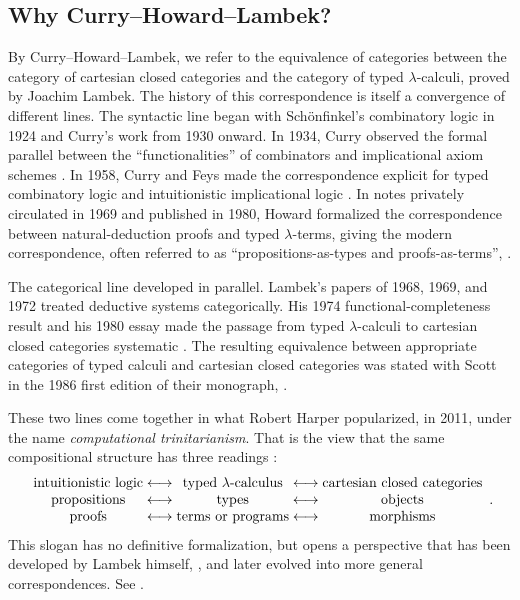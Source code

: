 \subsection*{Why Curry--Howard--Lambek?}
By Curry--Howard--Lambek, we refer to the equivalence of categories between the category of cartesian closed categories and the category of typed $\lambda$-calculi, proved by Joachim Lambek.
The history of this correspondence is itself a convergence of different lines. The syntactic line began with Schönfinkel's combinatory logic in 1924 and Curry's work from 1930 onward.
In 1934, Curry observed the formal parallel between the \enquote{functionalities} of combinators and implicational axiom schemes \parencite{Curry1934}.
In 1958, Curry and Feys made the correspondence explicit for typed combinatory logic and intuitionistic implicational logic \parencite[Part~I, pp.~41--45]{LambekScott1994}.
In notes privately circulated in 1969 and published in 1980, Howard formalized the correspondence between natural-deduction proofs and typed $\lambda$-terms, giving the modern correspondence, often referred to as \enquote{propositions-as-types and proofs-as-terms}, \parencite{Howard1980}\parencite[Part~I, p.~45]{LambekScott1994}.

The categorical line developed in parallel. Lambek's papers of 1968, 1969, and 1972 treated deductive systems categorically. His 1974 functional-completeness result and his 1980 essay made the passage from typed $\lambda$-calculi to cartesian closed categories systematic \parencite[Part~I, pp.~114--117]{LambekScott1994} \parencite{Lambek1980}.
The resulting equivalence between appropriate categories of typed calculi and cartesian closed categories was stated with Scott in the 1986 first edition of their monograph, \parencite[Part~I, Thm.~11.3, pp.~79--80]{LambekScott1994}.

These two lines come together in what Robert Harper popularized, in 2011, under the name \emph{computational trinitarianism}. That is the view that the same compositional structure has three readings \parencite{Harper2011}:
\[\begin{array}{c@{\;\longleftrightarrow\;}c@{\;\longleftrightarrow\;}c}  \text{intuitionistic logic} & \text{typed }\lambda\text{-calculus} & \text{cartesian closed categories} \\
                                                                          \text{propositions} & \text{types} & \text{objects} \\
                                                                          \text{proofs} & \text{terms or programs} & \text{morphisms} \end{array}.\]
This slogan has no definitive formalization, but opens a perspective that has been developed by Lambek himself, \parencite[Part II]{LambekScott1994}, and later evolved into more general correspondences. See \parencite{nLabComputationalTrilogy2026}\parencite{Shulman2018}.

